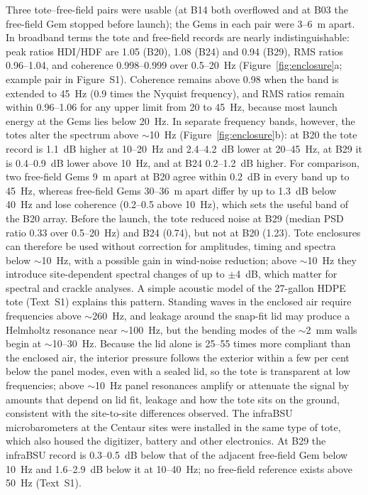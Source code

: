 \documentclass[]{seismica}
\newcommand{\suppfig}[1]{Figure~S#1}
\begin{document}
Three tote--free-field pairs were usable (at B14 both overflowed and at
B03 the free-field Gem stopped before launch); the Gems in each pair were
3--6~m apart. In broadband terms the tote and free-field records are
nearly indistinguishable: peak ratios HDI/HDF are 1.05 (B20), 1.08 (B24)
and 0.94 (B29), RMS ratios 0.96--1.04, and coherence 0.998--0.999 over
0.5--20~Hz (Figure~\ref{fig:enclosure}a; example pair in \suppfig{1}). Coherence remains above 0.98
when the band is extended to 45~Hz (0.9 times the Nyquist frequency),
and RMS ratios remain within 0.96--1.06 for any upper limit from 20 to
45~Hz, because most launch energy at the Gems lies below 20~Hz. In
separate frequency bands, however, the totes alter the spectrum above
$\sim$10~Hz (Figure~\ref{fig:enclosure}b): at B20 the tote record is 1.1~dB higher
at 10--20~Hz and 2.4--4.2~dB lower at 20--45~Hz, at B29 it is
0.4--0.9~dB lower above 10~Hz, and at B24 0.2--1.2~dB higher. For
comparison, two free-field Gems 9~m apart at B20 agree within 0.2~dB in
every band up to 45~Hz, whereas free-field Gems 30--36~m apart differ by
up to 1.3~dB below 40~Hz and lose coherence (0.2--0.5 above 10~Hz),
which sets the useful band of the B20 array. Before the launch, the tote
reduced noise at B29 (median PSD ratio 0.33 over 0.5--20~Hz) and B24
(0.74), but not at B20 (1.23). Tote enclosures can therefore be used
without correction for amplitudes, timing and spectra below $\sim$10~Hz,
with a possible gain in wind-noise reduction; above $\sim$10~Hz they
introduce site-dependent spectral changes of up to $\pm$4~dB, which
matter for spectral and crackle analyses.
A simple acoustic model of the 27-gallon HDPE tote (Text~S1) explains
this pattern. Standing waves in the enclosed air require frequencies
above $\sim$260~Hz, and leakage around the snap-fit lid may produce a
Helmholtz resonance near $\sim$100~Hz, but the bending modes of the
$\sim$2~mm walls begin at $\sim$10--30~Hz. Because the lid alone is
25--55 times more compliant than the enclosed air, the interior pressure follows
the exterior within a few per cent below the panel modes, even with a
sealed lid, so the tote is transparent at low frequencies; above
$\sim$10~Hz panel resonances amplify or attenuate the signal by amounts
that depend on lid fit, leakage and how the tote sits on the ground,
consistent with the site-to-site differences observed.
The infraBSU microbarometers at the Centaur sites were installed in the
same type of tote, which also housed the digitizer, battery and other
electronics. At B29 the infraBSU record is 0.3--0.5~dB below that of the
adjacent free-field Gem below 10~Hz and 1.6--2.9~dB below it at
10--40~Hz; no free-field reference exists above 50~Hz (Text~S1).
\end{document}

